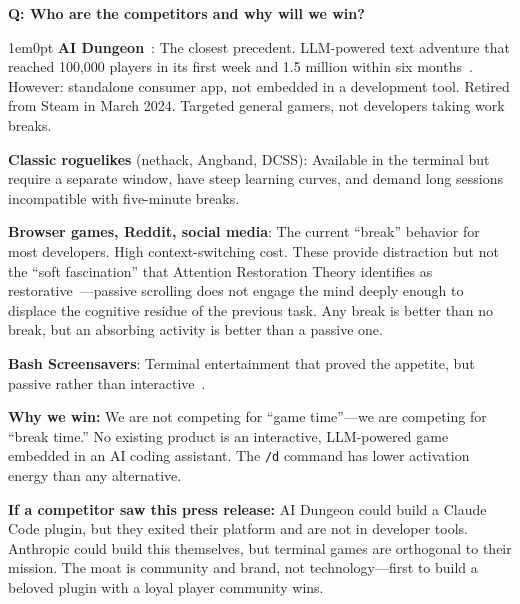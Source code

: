 \documentclass[11pt,letterpaper]{article}
\newcounter{faqnum}
\newenvironment{faqpair}[1]{%
  \needspace{4\baselineskip}%
  \vspace{0.5em}%
  \refstepcounter{faqnum}%
  \noindent\textbf{\color{SectionBlue}Q\thefaqnum: #1}\par\nopagebreak[4]%
  \vspace{0.2em}%
  \begin{adjustwidth}{1em}{0pt}%
  \setlength{\parindent}{0pt}%
}{%
  \end{adjustwidth}%
  \vspace{0.5em}%
}
\begin{document}
\begin{faqpair}{Who are the competitors and why will we win?}\label{faq:competitors}
  \textbf{AI Dungeon}~\cite{aidungeon2019}: The closest precedent. LLM-powered text adventure that reached 100,000 players in its first week and 1.5 million within six months~\cite{wikipedia2024aidungeon}. However: standalone consumer app, not embedded in a development tool. Retired from Steam in March 2024. Targeted general gamers, not developers taking work breaks.

  \textbf{Classic roguelikes} (nethack, Angband, DCSS): Available in the terminal but require a separate window, have steep learning curves, and demand long sessions incompatible with five-minute breaks.

  \textbf{Browser games, Reddit, social media}: The current ``break'' behavior for most developers. High context-switching cost. These provide distraction but not the ``soft fascination'' that Attention Restoration Theory identifies as restorative~\cite{kaplan1995art}---passive scrolling does not engage the mind deeply enough to displace the cognitive residue of the previous task. Any break is better than no break, but an absorbing activity is better than a passive one.

  \textbf{Bash Screensavers}: Terminal entertainment that proved the appetite, but passive rather than interactive~\cite{biggo2025bashscreensavers}.

  \textbf{Why we win:} We are not competing for ``game time''---we are competing for ``break time.'' No existing product is an interactive, LLM-powered game embedded in an AI coding assistant. The \texttt{/d} command has lower activation energy than any alternative.

  \textbf{If a competitor saw this press release:} AI Dungeon could build a Claude Code plugin, but they exited their platform and are not in developer tools. Anthropic could build this themselves, but terminal games are orthogonal to their mission. The moat is community and brand, not technology---first to build a beloved plugin with a loyal player community wins.
\end{faqpair}
\end{document}
